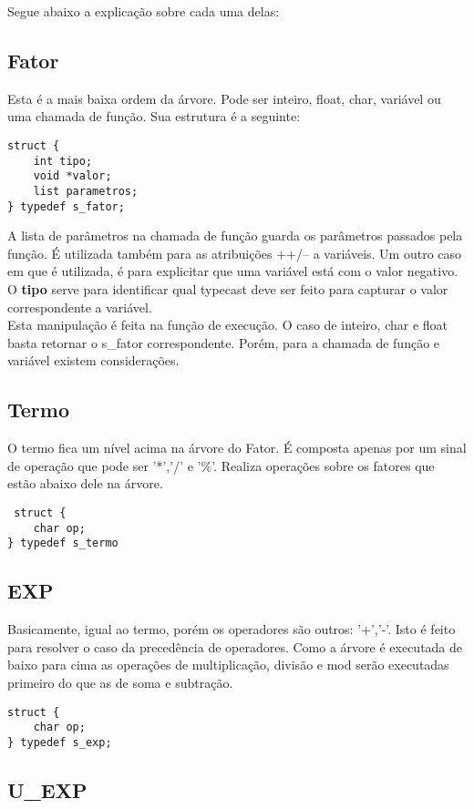 \documentclass[a4paper,10pt]{article}
\begin{document}
Segue abaixo a explicação sobre cada uma delas:

\subsection{Fator}
Esta é a mais baixa ordem da árvore. Pode ser inteiro, float, char, variável ou uma chamada de função. Sua estrutura é a seguinte:

\begin{lstlisting}
struct {
	int tipo;
	void *valor;
	list parametros;
} typedef s_fator;
\end{lstlisting}

A lista de parâmetros na chamada de função guarda os parâmetros passados pela função. É utilizada também para as atribuições ++/-- a variáveis. Um outro caso em que é utilizada,
é para explicitar que uma variável está com o valor negativo. 
O \textbf{tipo} serve para identificar qual typecast deve ser feito para capturar o valor correspondente a variável.\\
Esta manipulação é feita na função de execução. O caso de inteiro, char e float basta retornar o s_fator correspondente. Porém, para a chamada de função e variável existem
considerações.
\subsection{Termo}

O termo fica um nível acima na árvore do Fator. É composta apenas por um sinal de operação que pode ser '*','/' e '\%'. Realiza operações sobre os fatores que estão abaixo dele na árvore.

\begin{lstlisting}
 struct {
	char op;
} typedef s_termo
\end{lstlisting}

\subsection{EXP}
Basicamente, igual ao termo, porém os operadores são outros: '+','-'. Isto é feito para resolver o caso da precedência de operadores. Como a árvore é executada de baixo para cima as operações de multiplicação, divisão e mod serão executadas primeiro do que as de soma e subtração.

\begin{lstlisting}
struct {
	char op;
} typedef s_exp;
\end{lstlisting}

\subsection{U\_EXP}
\end{document}
